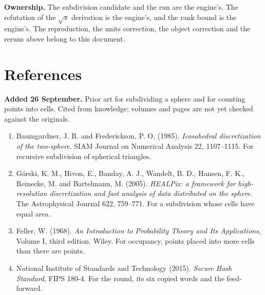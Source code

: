\textbf{Ownership.} The subdivision candidate and the run are the engine's. The refutation of the \(\sqrt{s}\) derivation is the engine's, and the rank bound is the engine's. The reproduction, the units correction, the object correction and the reruns above belong to this document.

\section{References}

\textbf{Added 26 September.} Prior art for subdividing a sphere and for counting points into cells. Cited from knowledge; volumes and pages are not yet checked against the originals.

\begin{enumerate}
  \item Baumgardner, J. R. and Frederickson, P. O. (1985). \emph{Icosahedral discretization of the two-sphere}. SIAM Journal on Numerical Analysis 22, 1107--1115. For recursive subdivision of spherical triangles.
  \item G\'orski, K. M., Hivon, E., Banday, A. J., Wandelt, B. D., Hansen, F. K., Reinecke, M. and Bartelmann, M. (2005). \emph{HEALPix: a framework for high-resolution discretization and fast analysis of data distributed on the sphere}. The Astrophysical Journal 622, 759--771. For a subdivision whose cells have equal area.
  \item Feller, W. (1968). \emph{An Introduction to Probability Theory and Its Applications}, Volume I, third edition. Wiley. For occupancy, points placed into more cells than there are points.
  \item National Institute of Standards and Technology (2015). \emph{Secure Hash Standard}, FIPS 180-4. For the round, its six copied words and the feed-forward.
\end{enumerate}
